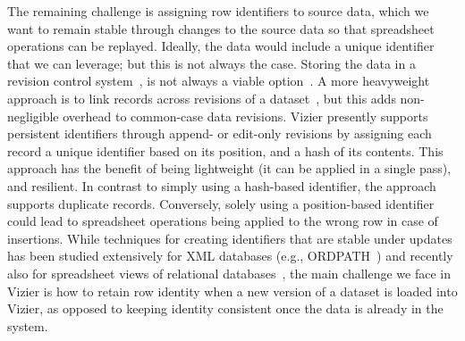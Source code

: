 The remaining challenge is assigning row identifiers to source data, which we want to remain stable through changes to the source data so that spreadsheet operations can be replayed.
Ideally, the data would include a unique identifier that we can leverage; but this is not always the case.
Storing the data in a revision control system~\cite{DBLP:conf/cidr/BhardwajBCDEMP15,DBLP:journals/pvldb/HuangXLEP17}, is not always a viable option~\cite{DBLP:conf/sigmod/AlagiannisBBIA12}.
A more heavyweight approach is to link records across revisions of a dataset~\cite{DBLP:conf/sigmod/YilmazWXNEP18}, but this adds non-negligible overhead to common-case data revisions.
Vizier presently supports persistent identifiers through append- or edit-only revisions by assigning each record a unique identifier based on its position, and a hash of its contents.
This approach has the benefit of being lightweight (it can be applied in a single pass), and resilient.
In contrast to simply using a hash-based identifier, the approach supports duplicate records.
Conversely, solely using a position-based identifier could lead to spreadsheet operations being applied to the wrong row in case of insertions.
%
While techniques for creating identifiers that are stable under updates has been studied extensively for XML databases (e.g., ORDPATH~\cite{DBLP:conf/sigmod/ONeilOPCSW04}) and recently also for spreadsheet views of relational databases~\cite{DBLP:journals/pvldb/BendreSZZCP15}, the main challenge we face in Vizier is how to retain row identity when a new version of a dataset is loaded into Vizier, as opposed to keeping identity consistent once the data is already in the system.


